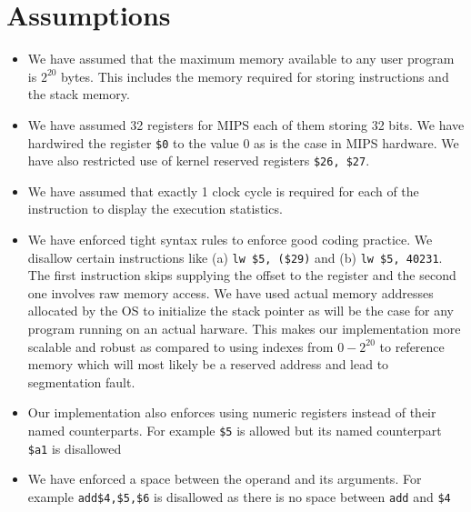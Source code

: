\documentclass[hidelinks,12pt]{article}
\begin{document}
\section{Assumptions}
\begin{itemize}
    \item We have assumed that the maximum memory available to any user program is $2^{20}$ bytes. This includes the memory required for storing instructions and the stack memory.
    \item We have assumed 32 registers for MIPS each of them storing 32 bits. We have hardwired the register \verb|$0| to the value $0$ as is the case in MIPS hardware. We have also restricted use of kernel reserved registers \verb|$26, $27|.
    \item We have assumed that exactly 1 clock cycle is required for each of the instruction to display the execution statistics.
    \item We have enforced tight syntax rules to enforce good coding practice. We disallow certain instructions like (a) \verb|lw $5, ($29)| and (b) \verb|lw $5, 40231|.
          The first instruction skips supplying the offset to the register and the second one involves raw memory access. We have used actual memory addresses allocated by the OS to initialize the stack pointer as will be the case for any program running on an actual harware.
          This makes our implementation more scalable and robust as compared to using indexes from $0 - 2^{20}$ to reference memory which will most likely be a reserved address and lead to segmentation fault.
    \item Our implementation also enforces using numeric registers instead of their named counterparts. For example \verb|$5| is allowed but its named counterpart \verb|$a1| is disallowed
    \item We have enforced a space between the operand and its arguments. For example \verb|add$4,$5,$6| is disallowed as there is no space between \verb|add| and \verb|$4|
\end{itemize}
\end{document}
